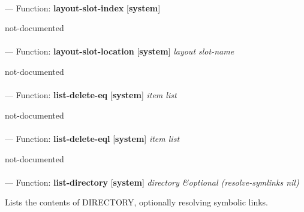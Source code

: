 \paragraph{}
\label{SYSTEM:LAYOUT-SLOT-INDEX}
--- Function: \textbf{layout-slot-index} [\textbf{system}] \textit{}

\begin{adjustwidth}{5em}{5em}
not-documented
\end{adjustwidth}

\paragraph{}
\label{SYSTEM:LAYOUT-SLOT-LOCATION}
--- Function: \textbf{layout-slot-location} [\textbf{system}] \textit{layout slot-name}

\begin{adjustwidth}{5em}{5em}
not-documented
\end{adjustwidth}

\paragraph{}
\label{SYSTEM:LIST-DELETE-EQ}
--- Function: \textbf{list-delete-eq} [\textbf{system}] \textit{item list}

\begin{adjustwidth}{5em}{5em}
not-documented
\end{adjustwidth}

\paragraph{}
\label{SYSTEM:LIST-DELETE-EQL}
--- Function: \textbf{list-delete-eql} [\textbf{system}] \textit{item list}

\begin{adjustwidth}{5em}{5em}
not-documented
\end{adjustwidth}

\paragraph{}
\label{SYSTEM:LIST-DIRECTORY}
--- Function: \textbf{list-directory} [\textbf{system}] \textit{directory \&optional (resolve-symlinks nil)}

\begin{adjustwidth}{5em}{5em}
Lists the contents of DIRECTORY, optionally resolving symbolic links.
\end{adjustwidth}

